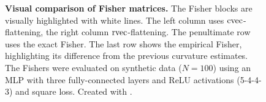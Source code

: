 \begin{figure}[!h]
\begin{minipage}[t]{0.49\linewidth}
  \end{minipage}
  \caption{\textbf{Visual comparison of Fisher matrices.}
    The Fisher blocks are visually highlighted with white lines.
    The left column uses $\operatorname{cvec}$-flattening, the right column $\operatorname{rvec}$-flattening.
    The penultimate row uses the exact Fisher.
    The last row shows the empirical Fisher, highlighting its difference from the previous curvature estimates.
    The Fishers were evaluated on synthetic data ($N=100$) using an MLP with three fully-connected layers and ReLU activations (5-4-4-3) and square loss.
    Created with .
  }\label{fig:visual-comparison-mc-empirical-fisher}
\end{figure}

